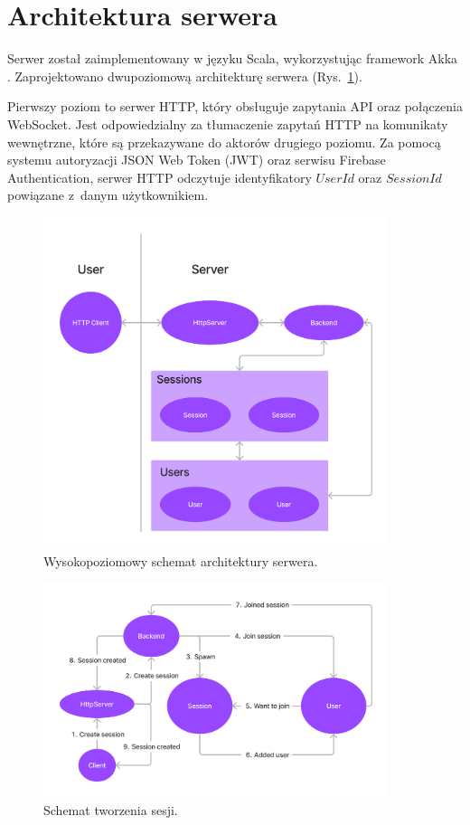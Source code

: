 \section{Architektura serwera}

Serwer został zaimplementowany w języku Scala,
wykorzystując framework Akka \cite{Akka}.
Zaprojektowano dwupoziomową architekturę serwera
(Rys.~\ref{fig:akka-highlevel}).

Pierwszy poziom to serwer HTTP, który obsługuje
zapytania API oraz połączenia WebSocket.
Jest odpowiedzialny za tłumaczenie zapytań HTTP na
komunikaty wewnętrzne, które są przekazywane do
aktorów drugiego poziomu.
Za pomocą systemu autoryzacji JSON Web Token (JWT)
oraz serwisu Firebase Authentication,
serwer HTTP odczytuje identyfikatory $UserId$ oraz
$SessionId$ powiązane z~danym użytkownikiem.

\begin{figure}[hp!]
  \centering
  \includegraphics[width=0.9\textwidth]{img/akka/HighLevel.png}
  \caption{Wysokopoziomowy schemat architektury serwera.}
  \label{fig:akka-highlevel}
\end{figure}

\begin{figure}[hp!]
  \centering
  \includegraphics[width=0.9\textwidth]{img/akka/CreateSession.png}
  \caption{Schemat tworzenia sesji.}
  \label{fig:akka-createsession}
\end{figure}

